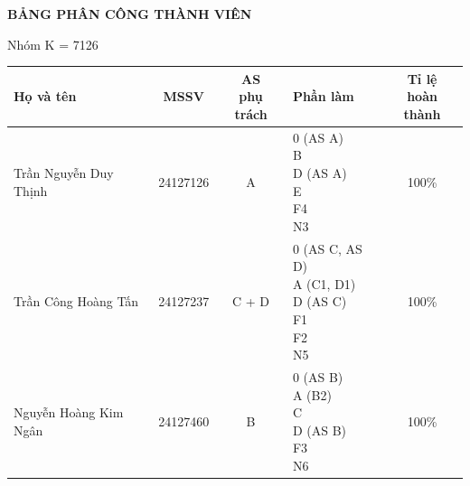 \clearpage
\begingroup
\thispagestyle{empty}
\setlength{\parindent}{0pt}

\begin{center}
{\fontsize{15}{19}\selectfont\bfseries
BẢNG PHÂN CÔNG THÀNH VIÊN}

\vspace{0.25cm}
Nhóm K = 7126
\end{center}

\vspace{0.4cm}

\begin{center}
\small
\renewcommand{\arraystretch}{1.4}
\setlength{\tabcolsep}{5pt}
\begin{tabularx}{\textwidth}{|
>{\raggedright\arraybackslash}p{4.4cm}|
c|c|
>{\raggedright\arraybackslash}X|
c|}
\hline
\textbf{Họ và tên} &
\textbf{MSSV} &
\makecell{\textbf{AS}\\\textbf{phụ trách}} &
\textbf{Phần làm} &
\makecell{\textbf{Tỉ lệ}\\\textbf{hoàn thành}} \\
\hline
Trần Nguyễn Duy Thịnh & 24127126 & A &
\makecell[tl]{0 (AS A)\\B\\D (AS A)\\E\\F4\\N3} & 100\% \\
\hline
Trần Công Hoàng Tấn & 24127237 & C + D &
\makecell[tl]{0 (AS C, AS D)\\A (C1, D1)\\D (AS C)\\F1\\F2\\N5} & 100\% \\
\hline
Nguyễn Hoàng Kim Ngân & 24127460 & B &
\makecell[tl]{0 (AS B)\\A (B2)\\C\\D (AS B)\\F3\\N6} & 100\% \\
\hline
\end{tabularx}
\end{center}

\clearpage
\endgroup
